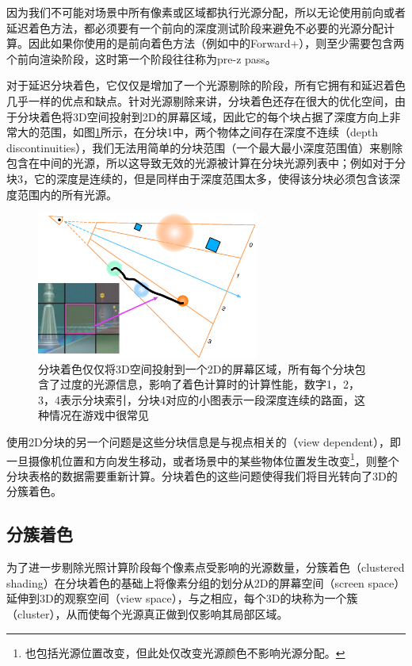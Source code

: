 因为我们不可能对场景中所有像素或区域都执行光源分配，所以无论使用前向或者延迟着色方法，都必须要有一个前向的深度测试阶段来避免不必要的光源分配计算。因此如果你使用的是前向着色方法（例如\cite{a:ForwardBringingDeferredLightingtotheNextLevel}中的Forward+），则至少需要包含两个前向渲染阶段，这时第一个阶段往往称为pre-z pass。

对于延迟分块着色，它仅仅是增加了一个光源剔除的阶段，所有它拥有和延迟着色几乎一样的优点和缺点。针对光源剔除来讲，分块着色还存在很大的优化空间，由于分块着色将3D空间投射到2D的屏幕区域，因此它的每个块占据了深度方向上非常大的范围，如图\ref{f:shade-tiled-problem}所示，在分块1中，两个物体之间存在深度不连续（depth discontinuities），我们无法用简单的分块范围（一个最大最小深度范围值）来剔除包含在中间的光源，所以这导致无效的光源被计算在分块光源列表中；例如对于分块3，它的深度是连续的，但是同样由于深度范围太多，使得该分块必须包含该深度范围内的所有光源。

\begin{figure}
	\sidecaption
	\includegraphics[width=0.65\textwidth]{figures/shade/tiled-problem}
	\caption{分块着色仅仅将3D空间投射到一个2D的屏幕区域，所有每个分块包含了过度的光源信息，影响了着色计算时的计算性能，数字1，2，3，4表示分块索引，分块4对应的小图表示一段深度连续的路面，这种情况在游戏中很常见}
	\label{f:shade-tiled-problem}
\end{figure}

使用2D分块的另一个问题是这些分块信息是与视点相关的（view dependent），即一旦摄像机位置和方向发生移动，或者场景中的某些物体位置发生改变\footnote{也包括光源位置改变，但此处仅改变光源颜色不影响光源分配。}，则整个分块表格的数据需要重新计算。分块着色的这些问题使得我们将目光转向了3D的分簇着色。





\subsection{分簇着色}\label{sec:shade-clustered-shading}
为了进一步剔除光照计算阶段每个像素点受影响的光源数量，分簇着色\cite{a:ClusteredDeferredandForwardShading}（clustered shading）在分块着色的基础上将像素分组的划分从2D的屏幕空间（screen space）延伸到3D的观察空间（view space），与之相应，每个3D的块称为一个簇（cluster），从而使每个光源真正做到仅影响其局部区域。

